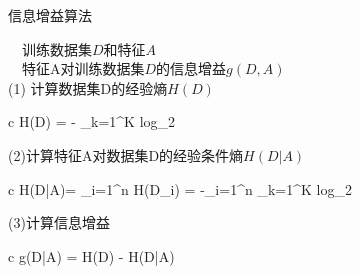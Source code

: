 ﻿\documentclass[]{book}
\begin{document}
\begin{algorithm}[2]
\caption{信息增益算法}
\label{alg:Framwork}
\begin{algorithmic}[] %
\REQUIRE ~~训练数据集$D$和特征$A$  \\ %

\ENSURE ~~特征A对训练数据集$D$的信息增益$g(D,A)$ \\ %
(1) 计算数据集D的经验熵$H(D)$ \\
\begin{array}{c}
\quad \quad H(D) = - \sum_{k=1}^{K} log_2
\end{array}

(2)计算特征A对数据集D的经验条件熵$H(D|A)$ \\
\begin{array}{c}
\quad \quad H(D|A)= \sum_{i=1}^{n} H(D_i) = -\sum_{i=1}^n  \sum_{k=1}^K log_2
\end{array}

(3)计算信息增益 \\
\begin{array}{c}
\quad \quad g(D|A) = H(D) - H(D|A)
\end{array}
\end{algorithmic}
\end{algorithm}
\end{document}

